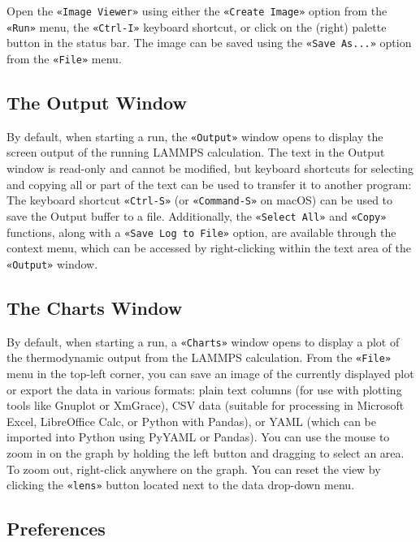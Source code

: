 \documentclass[9pt,tutorial]{livecoms}
\newcommand{\guicmd}[1]{\textcolor{command}{\texttt{«#1»}}} %
\begin{document}
\begin{appendices}
Open the \guicmd{Image Viewer} using either the \guicmd{Create Image} option
from the \guicmd{Run} menu, the \guicmd{Ctrl-I} keyboard shortcut,
or click on the (right) palette button in the status bar.  The image
can be saved using the \guicmd{Save As...} option from the \guicmd{File} menu.

\subsection{The Output Window}

By default, when starting a run, the \guicmd{Output} window opens to display the screen
output of the running LAMMPS calculation.  The text in the Output window is
read-only and cannot be modified, but keyboard shortcuts for selecting and
copying all or part of the text can be used to transfer it to another program:
The keyboard shortcut \guicmd{Ctrl-S} (or \guicmd{Command-S} on {macOS}) can
be used to save the Output buffer to a file.  Additionally, the \guicmd{Select All}
and \guicmd{Copy} functions, along with a \guicmd{Save Log to File} option, are available
through the context menu, which can be accessed by right-clicking within the text area of the
\guicmd{Output} window.

\subsection{The Charts Window}

By default, when starting a run, a \guicmd{Charts} window opens to display
a plot of the thermodynamic output from the LAMMPS calculation.  From the \guicmd{File}
menu in the top-left corner, you can save an image of the
currently displayed plot or export the data in various formats:
plain text columns (for use with plotting tools like Gnuplot or XmGrace),
CSV data (suitable for processing in Microsoft Excel, LibreOffice Calc,
or Python with Pandas), or YAML (which can be imported into Python using PyYAML or Pandas).
You can use the mouse to zoom in on the graph by holding the left button and dragging
to select an area.  To zoom out, right-click anywhere on the graph.  You can reset the view
by clicking the \guicmd{lens} button located next to the data drop-down menu.

\subsection{Preferences}


\end{appendices}
\end{document}
